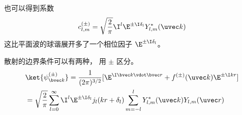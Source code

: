 也可以得到系数
\begin{equation}
c_{l,m}^{(\pm)} = \sqrt{\frac{2}{\pi}} \I^l \E^{\pm \I \delta_l} Y_{l,m}^*(\uvec k)
\end{equation}
这比平面波的球谐展开多了一个相位因子 $\E^{\pm \I \delta_l}$。

散射的边界条件可以有两种， 用 $\pm$ 区分。
\begin{equation}
\begin{aligned}
&\ket{\psi_{\bvec k}^{(\pm)}} = \frac{1}{(2\pi)^{3/2}}[\E^{\I \bvec k \vdot \bvec r} + f^{(\pm)}(\uvec k)\E^{\pm\I kr}]\\
&= \sqrt{\frac{2}{\pi}} \sum_{l=0}^{\infty} \I^l \E^{\pm\I \delta_l} j_l(kr + \delta_l) \sum_{m=-l}^l Y_{l,m}^*(\uvec k) Y_{l,m}(\uvec r)
\end{aligned}
\end{equation}
